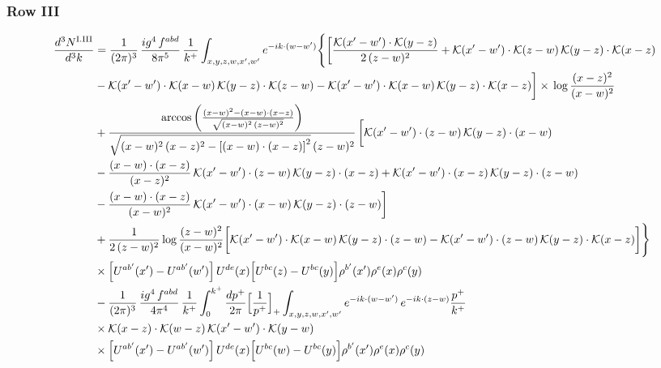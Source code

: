 \documentclass[9pt]{article}
\numberwithin{equation}{section}
\begin{document}
\subsubsection*{Row III}
\begin{align}
\frac{d^{3}N^{\rm I.III}}{d^{3}k} &=\frac{1}{(2\pi)^{3}}\,\frac{ig^{4}\,f^{abd}}{8\pi^{5}}\,\frac{1}{k^{+}}\int_{x,y,z,w,x',w'}e^{-ik\cdot(w-w')}\Bigg\{\bigg[\frac{\mathcal{K}(x'-w')\cdot\mathcal{K}(y-z)}{2\,(z-w)^{2}}+\mathcal{K}(x'-w')\cdot\mathcal{K}(z-w)\,\mathcal{K}(y-z)\cdot\mathcal{K}(x-z)\notag \\
&-\mathcal{K}(x'-w')\cdot\mathcal{K}(x-w)\,\mathcal{K}(y-z)\cdot\mathcal{K}(z-w)-\mathcal{K}(x'-w')\cdot\mathcal{K}(x-w)\,\mathcal{K}(y-z)\cdot\mathcal{K}(x-z)\bigg]\times\, \log\frac{(x-z)^{2}}{(x-w)^{2}}\notag \\
&+\frac{\arccos\left(\frac{(x-w)^{2}-(x-w)\cdot (x-z)}{\sqrt{(x-w)^{2}\,(z-w)^{2}}}\right)}{\sqrt{(x-w)^{2}\,(x-z)^{2}-\left[(x-w)\cdot (x-z)\right]^{2}}\,(z-w)^{2}}\,\bigg[\mathcal{K}(x'-w')\cdot(z-w)\,\mathcal{K}(y-z)\cdot(x-w)\notag \\ & -\frac{(x-w)\cdot(x-z)}{(x-z)^{2}}\,\mathcal{K}(x'-w')\cdot(z-w)\,\mathcal{K}(y-z)\cdot(x-z)+\mathcal{K}(x'-w')\cdot(x-z)\,\mathcal{K}(y-z)\cdot(z-w)\notag \\ & -\frac{(x-w)\cdot(x-z)}{(x-w)^{2}}\,\mathcal{K}(x'-w')\cdot(x-w)\,\mathcal{K}(y-z)\cdot(z-w)\bigg]\notag \\
&+\frac{1}{2\,(z-w)^{2}}\log\frac{(z-w)^{2}}{(x-w)^{2}}\bigg[\mathcal{K}(x'-w')\cdot\mathcal{K}(x-w)\,\mathcal{K}(y-z)\cdot(z-w)-\mathcal{K}(x'-w')\cdot(z-w)\,\mathcal{K}(y-z)\cdot\mathcal{K}(x-z)\bigg]\Bigg\}\notag\\
&\times\Big[U^{ab'}(x')-U^{ab'}(w')\Big]\,U^{de}(x)\Big[U^{bc}(z)-U^{bc}(y)\Big]\rho^{b'}(x')\rho^{e}(x)\rho^{c}(y)\notag\\ &-\frac{1}{(2\pi)^{3}}\,\frac{ig^{4}\,f^{abd}}{4\pi^{4}}\,\frac{1}{k^{+}}\int_{0}^{k^{+}}\frac{dp^{+}}{2\pi}\Big[\frac{1}{p^{+}}\Big]_{+}\int_{x,y,z,w,x',w'}e^{-ik\cdot(w-w')}\,e^{-ik\cdot(z-w)}\frac{p^{+}}{k^{+}}\notag\\
&\times\mathcal{K}(x-z)\cdot\mathcal{K}(w-z)\,\mathcal{K}(x'-w')\cdot\mathcal{K}(y-w)\notag\\
&\times\Big[U^{ab'}(x')-U^{ab'}(w')\Big]\,U^{de}(x)\Big[U^{bc}(w)-U^{bc}(y)\Big]\rho^{b'}(x')\rho^{e}(x)\rho^{c}(y)\label{eq:B-I3}
\end{align}
\end{document}
